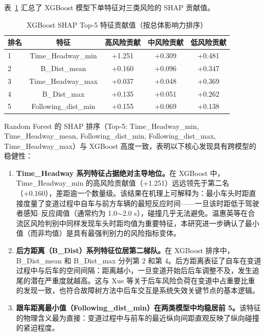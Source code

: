 \documentclass[preprint,review,12pt,a4paper]{elsarticle}
\begin{document}
表~\ref{tab:shap} 汇总了 XGBoost 模型下单特征对三类风险的 SHAP 贡献值。

\begin{table}[H]
\centering
\caption{XGBoost SHAP Top-5 特征贡献值（按总体影响力排序）}
\label{tab:shap}
\small
\begin{tabular}{lcccc}
\toprule
排名 & 特征 & 高风险贡献 & 中风险贡献 & 低风险贡献 \\
\midrule
1 & Time\_Headway\_min & +1.251 & +0.309 & +0.481 \\
2 & B\_Dist\_mean & +0.160 & +0.096 & +0.347 \\
3 & Time\_Headway\_max & +0.037 & +0.048 & +0.369 \\
4 & B\_Dist\_max & +0.135 & +0.051 & +0.262 \\
5 & Following\_dist\_min & +0.155 & +0.069 & +0.138 \\
\bottomrule
\end{tabular}
\end{table}

Random Forest 的 SHAP 排序（Top-5: Time\_Headway\_min, Time\_Headway\_mean, Following\_dist\_min, Following\_dist\_max, Time\_Headway\_max）与 XGBoost 高度一致，表明以下核心发现具有跨模型的稳健性：

\begin{enumerate}
  \item \textbf{Time\_Headway 系列特征占据绝对主导地位。}在 XGBoost 中，Time\_Headway\_min 的高风险贡献值（+1.251）远远领先于第二名（+0.160），差距逾一个数量级。该结果在机理上可解释为：最小车头时距直接度量了变道过程中自车与前方车辆的最短反应时间——一旦该时距低于驾驶者感知--反应阈值（通常约为 1.0$\sim$2.0 s），碰撞几乎无法避免。温惠英等\cite{C10}在合流区风险判别中同样发现车头时距均值为重要特征，本研究进一步确认了最小值（而非均值）是具有最强判别力的风险指标变体。

  \item \textbf{后方距离（B\_Dist）系列特征位居第二梯队。}在 XGBoost 排序中，B\_Dist\_mean 和 B\_Dist\_max 分列第 2 和第 4。后方距离表征了自车在变道过程中与后车的空间间隔：距离越小，一旦变道开始后后车调整不及，发生追尾的潜在严重度就越高。这与 Xue 等\cite{C02}关于后车风险负荷在变道中占重要比重的发现一致，也符合故障树方法中后车交互是系统失效关键节点\cite{C03,C08}的基本逻辑。

  \item \textbf{跟车距离最小值（Following\_dist\_min）在两类模型中均稳居前 5。}该特征的物理含义最为直接：变道过程中与前车的最近纵向间距直观反映了纵向碰撞的紧迫程度。
\end{enumerate}
\end{document}
